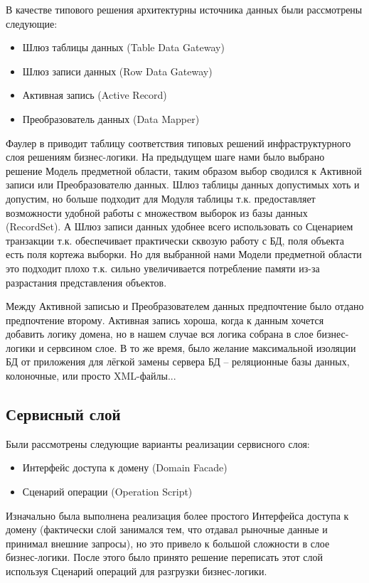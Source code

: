 \documentclass[a4paper, 12pt]{article}        %
\begin{document}
В качестве типового решения архитектурны источника данных были рассмотрены следующие:
\begin{itemize}
\item Шлюз таблицы данных (Table Data Gateway)
\item Шлюз записи данных (Row Data Gateway)
\item Активная запись (Active Record)
\item Преобразователь данных (Data Mapper)
\end{itemize}

Фаулер в \cite{m1} приводит таблицу соответствия типовых решений инфраструктурного слоя решениям бизнес-логики. На предыдущем шаге нами было выбрано решение Модель предметной области, таким образом выбор сводился к Активной записи или Преобразователю данных. Шлюз таблицы данных допустимых хоть и допустим, но больше подходит для Модуля таблицы т.к. предоставляет возможности удобной работы с множеством выборок из базы данных (RecordSet). А Шлюз записи данных удобнее всего использовать со Сценарием транзакции т.к. обеспечивает практически сквозую работу с БД, поля объекта есть поля кортежа выборки. Но для выбранной нами Модели предметной области это подходит плохо т.к. сильно увеличивается потребление памяти из-за разрастания представления объектов.

Между Активной записью и Преобразователем данных предпочтение было отдано предпочтение второму. Активная запись хороша, когда к данным хочется добавить логику домена, но в нашем случае вся логика собрана в слое бизнес-логики и сервсином слое. В то же время, было желание максимальной изоляции БД от приложения для лёгкой замены сервера БД -- реляционные базы данных, колоночные, или просто XML-файлы...

\subsection{Сервисный слой}

Были рассмотрены следующие варианты реализации сервисного слоя:
\begin{itemize}
\item Интерфейс доступа к домену (Domain Facade)
\item Сценарий операции (Operation Script)
\end{itemize}

Изначально была выполнена реализация более простого Интерфейса доступа к домену (фактически слой занимался тем, что отдавал рыночные данные и принимал внешние запросы), но это привело к большой сложности в слое бизнес-логики. После этого было принято решение переписать этот слой используя Сценарий операций для разгрузки бизнес-логики.
\end{document}
